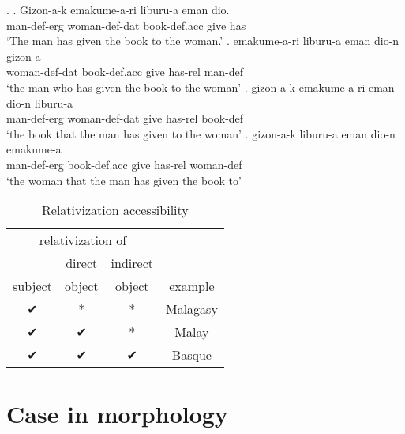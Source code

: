 \ex.
\ag. Gizon-a-k emakume-a-ri liburu-a eman dio.\\
 man-\ac{def}-\ac{erg} woman-\ac{def}-\ac{dat} book-\ac{def}.\ac{acc} give has\\
 `The man has given the book to the woman.'
\bg. emakume-a-ri liburu-a eman dio-n gizon-a\\
 woman-\ac{def}-\ac{dat} book-\ac{def}.\ac{acc} give has-\ac{rel} man-\ac{def}\\
 `the man who has given the book to the woman'
\bg. gizon-a-k emakume-a-ri eman dio-n liburu-a\\
 man-\ac{def}-\ac{erg} woman-\ac{def}-\ac{dat} give has-\ac{rel} book-\ac{def}\\
 `the book that the man has given to the woman'
\bg. gizon-a-k liburu-a eman dio-n emakume-a\\
 man-\ac{def}-\ac{erg} book-\ac{def}.\ac{acc} give has-\ac{rel} woman-\ac{def}\\
 `the woman that the man has given the book to' 




 \begin{table}[H]
   \center
   \caption {Relativization accessibility}
     \begin{tabular}{cccc}
       \toprule
             \multicolumn{3}{c}{relativization of}
           & \\
       \cmidrule{1-3}
             & direct
             & indirect
           & \\
             subject
             & object
             & object
           & example \\
       \cmidrule{1-3} \cmidrule{4-4}
             ✔
             & *
             & *
           & Malagasy \\
             ✔
             & ✔
             & *
           & Malay \\
             ✔
             & ✔
             & ✔
           & Basque \\
       \bottomrule
     \end{tabular}
 \end{table}






\section{Case in morphology}





